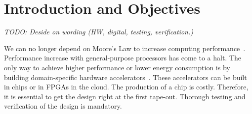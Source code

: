 \documentclass[fleqn,12pt]{article}
\newcommand{\todo}[1]{{\it TODO: #1}}
\begin{document}
%
%
%
%
%

\section{Introduction and Objectives}
\label{sec:objectives}

\todo{Deside on wording (HW, digital, testing, verification.)}


We can no longer depend on Moore's Law to increase computing performance~\cite{dark-silicon:2011}.
Performance increase with general-purpose processors has come to a halt.
The only way to achieve higher performance or lower energy consumption
is by building domain-specific hardware accelerators~\cite{domain-hw-acc:2020}.
These accelerators can be built in chips or in FPGAs in the cloud.
The production of a chip is costly. Therefore, it is essential to get
the design right at the first tape-out. Thorough testing and verification of the design is mandatory.
\end{document}
